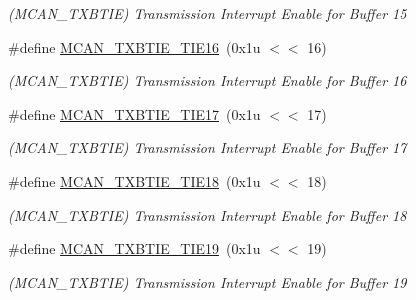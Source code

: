 \begin{DoxyCompactItemize}
\begin{DoxyCompactList}\small\item\em (M\+C\+A\+N\+\_\+\+T\+X\+B\+T\+IE) Transmission Interrupt Enable for Buffer 15 \end{DoxyCompactList}\item 
\mbox{\label{group__SAMV71__MCAN_ga812bc0ab034927b1b29f1c01849c6bc1}} 
\#define \mbox{\hyperlink{group__SAMV71__MCAN_ga812bc0ab034927b1b29f1c01849c6bc1}{M\+C\+A\+N\+\_\+\+T\+X\+B\+T\+I\+E\+\_\+\+T\+I\+E16}}~(0x1u $<$$<$ 16)
\begin{DoxyCompactList}\small\item\em (M\+C\+A\+N\+\_\+\+T\+X\+B\+T\+IE) Transmission Interrupt Enable for Buffer 16 \end{DoxyCompactList}\item 
\mbox{\label{group__SAMV71__MCAN_ga74d1c9d835e2056a7c52aafebee92ddb}} 
\#define \mbox{\hyperlink{group__SAMV71__MCAN_ga74d1c9d835e2056a7c52aafebee92ddb}{M\+C\+A\+N\+\_\+\+T\+X\+B\+T\+I\+E\+\_\+\+T\+I\+E17}}~(0x1u $<$$<$ 17)
\begin{DoxyCompactList}\small\item\em (M\+C\+A\+N\+\_\+\+T\+X\+B\+T\+IE) Transmission Interrupt Enable for Buffer 17 \end{DoxyCompactList}\item 
\mbox{\label{group__SAMV71__MCAN_gaae2f26490e79e1918b294e44a50d076a}} 
\#define \mbox{\hyperlink{group__SAMV71__MCAN_gaae2f26490e79e1918b294e44a50d076a}{M\+C\+A\+N\+\_\+\+T\+X\+B\+T\+I\+E\+\_\+\+T\+I\+E18}}~(0x1u $<$$<$ 18)
\begin{DoxyCompactList}\small\item\em (M\+C\+A\+N\+\_\+\+T\+X\+B\+T\+IE) Transmission Interrupt Enable for Buffer 18 \end{DoxyCompactList}\item 
\mbox{\label{group__SAMV71__MCAN_ga8f919e67cd11e6c2a3e5ba0fac67b9c9}} 
\#define \mbox{\hyperlink{group__SAMV71__MCAN_ga8f919e67cd11e6c2a3e5ba0fac67b9c9}{M\+C\+A\+N\+\_\+\+T\+X\+B\+T\+I\+E\+\_\+\+T\+I\+E19}}~(0x1u $<$$<$ 19)
\begin{DoxyCompactList}\small\item\em (M\+C\+A\+N\+\_\+\+T\+X\+B\+T\+IE) Transmission Interrupt Enable for Buffer 19 \end{DoxyCompactList}\item 

\end{DoxyCompactItemize}
